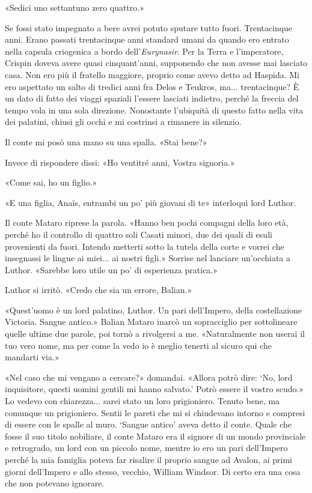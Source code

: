 «Sedici uno settantuno zero quattro.»

Se fossi stato impegnato a bere avrei potuto sputare tutto fuori.
Trentacinque anni. Erano passati trentacinque anni standard umani da
quando ero entrato nella capsula criogenica a bordo
dell'\emph{Eurynasir}. Per la Terra e l'imperatore, Crispin doveva avere
quasi cinquant'anni, supponendo che non avesse mai lasciato casa. Non
ero più il fratello maggiore, proprio come avevo detto ad Haspida. Mi
ero aspettato un salto di tredici anni fra Delos e Teukros, ma...
trentacinque? È un dato di fatto dei viaggi spaziali l'essere lasciati
indietro, perché la freccia del tempo vola in una sola direzione.
Nonostante l'ubiquità di questo fatto nella vita dei palatini, chiusi
gli occhi e mi costrinsi a rimanere in silenzio.

Il conte mi posò una mano su una spalla. «Stai bene?»

Invece di rispondere dissi: «Ho ventitré anni, Vostra signoria.»

«Come sai, ho un figlio.»

«E una figlia, Anaïs, entrambi un po' più giovani di te» interloquì lord
Luthor.

Il conte Mataro riprese la parola. «Hanno ben pochi compagni della loro
età, perché ho il controllo di quattro soli Casati minori, due dei quali
di esuli provenienti da fuori. Intendo metterti sotto la tutela della
corte e vorrei che insegnassi le lingue ai miei... ai nostri figli.»
Sorrise nel lanciare un'occhiata a Luthor. «Sarebbe loro utile un po' di
esperienza pratica.»

Luthor si irritò. «Credo che sia un errore, Balian.»

«Quest'uomo è un lord palatino, Luthor. Un pari dell'Impero, della
costellazione Victoria. Sangue antico.» Balian Mataro inarcò un
sopracciglio per sottolineare quelle ultime due parole, poi tornò a
rivolgersi a me. «Naturalmente non userai il tuo vero nome, ma per come
la vedo io è meglio tenerti al sicuro qui che mandarti via.»

«Nel caso che mi vengano a cercare?» domandai. «Allora potrò dire: `No,
lord inquisitore, questi uomini gentili mi hanno salvato.' Potrò essere
il vostro scudo.» Lo vedevo con chiarezza... sarei stato un loro
prigioniero. Tenuto bene, ma comunque un prigioniero. Sentii le pareti
che mi si chiudevano intorno e compresi di essere con le spalle al muro.
`Sangue antico' aveva detto il conte. Quale che fosse il suo titolo
nobiliare, il conte Mataro era il signore di un mondo provinciale e
retrogrado, un lord con un piccolo nome, mentre io ero un pari
dell'Impero perché la mia famiglia poteva far risalire il proprio sangue
ad Avalon, ai primi giorni dell'Impero e allo stesso, vecchio, William
Windsor. Di certo era una cosa che non potevano ignorare.


